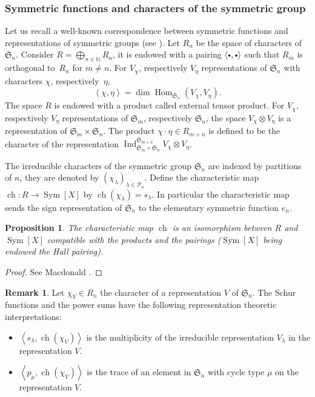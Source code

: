 \documentclass[11pt]{article}
\newcommand{\sbullet}{{\scriptscriptstyle\bullet}}
\newcommand{\csbullet}{{\raisebox{1pt}{$\sbullet$}}}
\theoremstyle{definition}
\newtheorem{remark}[definition]{Remark}
\theoremstyle{plain}
\newtheorem{proposition}[definition]{Proposition}
\DeclareMathOperator{\Hom}{Hom}
\DeclareMathOperator{\SymF}{Sym}
\DeclareMathOperator{\Ind}{Ind}
\DeclareMathOperator{\ch}{ch}
\newcommand{\Sym}{\mathfrak{S}}
\newcommand{\SymX}{\SymF [X]}
\newcommand{\Part}{\mathcal{P}}
\begin{document}
\subsubsection{Symmetric functions and characters of the symmetric group}
Let us recall a well-known correspondence between symmetric functions and representations of symmetric groups (see \cite{Macdonald}). Let $R_n$ be the space of characters of $\Sym_n$. Consider $R=\bigoplus_{n\in\mathbb{N}} R_n$, it is endowed with a pairing $\langle\csbullet,\csbullet\rangle$ such that $R_m$ is orthogonal to~$R_n$ for $m\ne n$. For $V_\chi$, respectively $V_\eta$ representations of $\Sym_n$ with characters $\chi$, respectively~$\eta$,
\[
\left\langle \chi,\eta\right\rangle = \dim \Hom_{\Sym_n}(V_{\chi}, V_{\eta}).
\]
The space $R$ is endowed with a product called external tensor product. For $V_\chi$, respectively $V_{\eta}$ representations of $\Sym_m$, respectively $\Sym_n$, the space $V_\chi \otimes V_\eta$ is a representation of $\Sym_m \times \Sym_n$. The product $\chi\cdot\eta\in R_{m+n}$ is defined to be the character of the representation $\Ind_{\Sym_m\times\Sym_n}^{\Sym_{m+n}}V_\chi \otimes V_\eta$.

The irreducible characters of the symmetric group $\Sym_n$ are indexed by partitions of $n$, they are denoted by $(\chi_{\lambda})_{\lambda\in\Part_n}$. Define the characteristic map $\ch:R\to \SymF[X]$ by $\ch(\chi_{\lambda})=s_{\lambda}$.
In particular the characteristic map sends the sign representation of $\Sym_n$ to the elementary symmetric function $e_n$.

\begin{proposition}\label{prop_characteristic_map}
The characteristic map $\ch$ is an isomorphism between $R$ and $\SymX$ compatible with the products and the pairings ($\SymX$ being endowed the Hall pairing).
\end{proposition}
\begin{proof}
See Macdonald \cite[I-7]{Macdonald}.
\end{proof}

\begin{remark}\label{remark_trace_mult}
Let $\chi_V\in R_n$ the character of a representation $V$ of $\Sym_n$. The Schur functions and the power sums have the following representation theoretic interpretations:
\begin{itemize}
\item $\left\langle s_{\lambda},\ch(\chi_{V})\right\rangle$ is the multiplicity of the irreducible representation $V_{\lambda}$ in the representation $V$.
\item $\left\langle p_{\mu},\ch(\chi_{V})\right\rangle$ is the trace of an element in $\Sym_n$ with cycle type $\mu$ on the representation $V$.
\end{itemize}
\end{remark}
\end{document}

